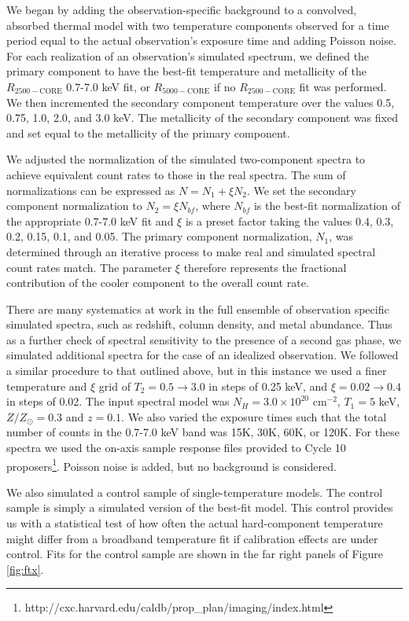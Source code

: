 We began by adding the observation-specific background to a convolved,
absorbed thermal model with two temperature components observed for a
time period equal to the actual observation's exposure time and adding
Poisson noise. For each realization of an observation's simulated
spectrum, we defined the primary component to have the best-fit
temperature and metallicity of the $R_{2500-\mathrm{CORE}}$ 0.7-7.0
keV fit, or $R_{5000-\mathrm{CORE}}$ if no $R_{2500-\mathrm{CORE}}$
fit was performed. We then incremented the secondary component
temperature over the values 0.5, 0.75, 1.0, 2.0, and 3.0 keV. The
metallicity of the secondary component was fixed and set equal to the
metallicity of the primary component.

We adjusted the normalization of the simulated two-component spectra
to achieve equivalent count rates to those in the real spectra. The
sum of normalizations can be expressed as $N = N_1 + \xi N_2$. We set
the secondary component normalization to $N_2 = \xi N_{bf}$, where
$N_{bf}$ is the best-fit normalization of the appropriate 0.7-7.0 keV
fit and $\xi$ is a preset factor taking the values 0.4, 0.3, 0.2,
0.15, 0.1, and 0.05. The primary component normalization, $N_1$, was
determined through an iterative process to make real and simulated
spectral count rates match. The parameter $\xi$ therefore represents
the fractional contribution of the cooler component to the overall
count rate.

There are many systematics at work in the full ensemble of observation
specific simulated spectra, such as redshift, column density, and
metal abundance. Thus as a further check of spectral sensitivity to
the presence of a second gas phase, we simulated additional spectra
for the case of an idealized observation. We followed a similar
procedure to that outlined above, but in this instance we used a finer
temperature and $\xi$ grid of $T_2 = 0.5 \rightarrow 3.0$ in steps of
0.25 keV, and $\xi = 0.02 \rightarrow 0.4$ in steps of 0.02. The input
spectral model was $N_{H} = 3.0\times10^{20}$ cm$^{-2}$, $T_1 = 5$
keV, $Z/Z_{\odot} = 0.3$ and $z = 0.1$. We also varied the exposure
times such that the total number of counts in the 0.7-7.0 keV band was
15K, 30K, 60K, or 120K. For these spectra we used the on-axis sample
response files provided to Cycle 10
proposers\footnote{http://cxc.harvard.edu/caldb/prop\_plan/imaging/index.html}.
Poisson noise is added, but no background is considered.

We also simulated a control sample of single-temperature models. The
control sample is simply a simulated version of the best-fit
model. This control provides us with a statistical test of how often
the actual hard-component temperature might differ from a broadband
temperature fit if calibration effects are under control. Fits for the
control sample are shown in the far right panels of Figure
\ref{fig:ftx}.


